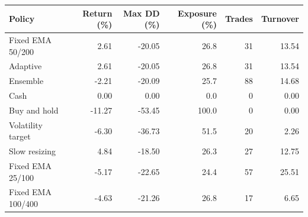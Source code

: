\begin{tabular}{lrrrrr}\toprule Policy & Return (\%) & Max DD (\%) & Exposure (\%) & Trades & Turnover\\\midrule
Fixed EMA 50/200 & 2.61 & -20.05 & 26.8 & 31 & 13.54\\
Adaptive & 2.61 & -20.05 & 26.8 & 31 & 13.54\\
Ensemble & -2.21 & -20.09 & 25.7 & 88 & 14.68\\
Cash & 0.00 & 0.00 & 0.0 & 0 & 0.00\\
Buy and hold & -11.27 & -53.45 & 100.0 & 0 & 0.00\\
Volatility target & -6.30 & -36.73 & 51.5 & 20 & 2.26\\
Slow resizing & 4.84 & -18.50 & 26.3 & 27 & 12.75\\
Fixed EMA 25/100 & -5.17 & -22.65 & 24.4 & 57 & 25.51\\
Fixed EMA 100/400 & -4.63 & -21.26 & 26.8 & 17 & 6.65\\
\bottomrule\end{tabular}
